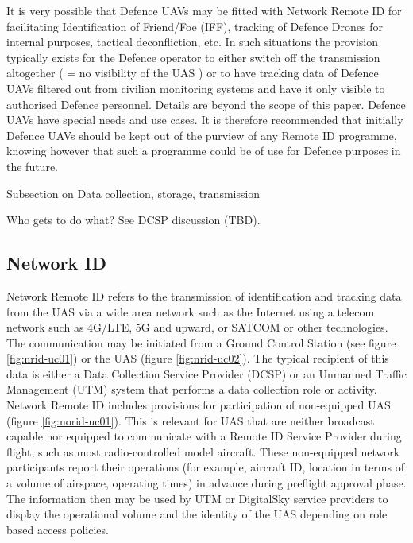 \documentclass{ua_wgs_base}
\begin{document}
It is very possible that Defence UAVs may be fitted with Network Remote
ID for facilitating Identification of Friend/Foe (IFF),
tracking of Defence Drones for internal purposes, tactical deconfliction,
etc. In such situations the provision typically exists for the Defence
operator to either switch off the transmission altogether ( = no visibility
of the UAS ) or to have tracking data of Defence UAVs filtered out
from civilian monitoring systems and have it only visible to authorised
Defence personnel. Details are beyond the scope of this paper. Defence
UAVs have special needs and use cases. It is therefore recommended
that initially Defence UAVs should be kept out of the purview of any
Remote ID programme, knowing however that such a programme could be
of use for Defence purposes in the future.

\begin{lyxgreyedout}
Subsection on Data collection, storage, transmission

Who gets to do what? See DCSP discussion (TBD).
\end{lyxgreyedout}


\subsection{Network ID}

Network Remote ID refers to the transmission of identification and tracking 
data from the UAS via a wide area network such as the Internet using a 
telecom network such as 4G/LTE, 5G and upward, or SATCOM or other technologies.
The communication may be initiated from a Ground Control Station (see figure
\ref{fig:nrid-uc01}) or the UAS (figure \ref{fig:nrid-uc02}).
The typical recipient of this data is either a Data Collection Service 
Provider (DCSP) or an Unmanned Traffic Management (UTM) system that performs
a data collection role or activity. Network Remote ID includes provisions for
participation of non-equipped UAS (figure \ref{fig:norid-uc01}). This is 
relevant for UAS that are neither broadcast capable nor equipped to communicate
with a Remote ID Service Provider during flight, such as most radio-controlled
model aircraft. These non-equipped network participants report their 
operations (for example, aircraft ID, location in terms of a volume of 
airspace, operating times) in advance during preflight approval phase. The
information then may be used by UTM or DigitalSky service providers to
display the operational volume and the identity of the UAS depending on role based
access policies.
\end{document}
